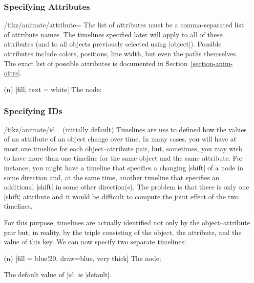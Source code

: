 \subsubsection{Specifying Attributes}
\label{section-anim-def-attr}

\begin{key}{/tikz/animate/attribute=}
    The list of attributes must be a comma-separated list of attribute names.
    The timelines specified later will apply to all of these attributes (and to
    all objects previously selected using |object|). Possible attributes
    include colors, positions, line width, but even the paths themselves. The
    exact list of possible attributes is documented in
    Section~\ref{section-anim-attrs}.
\begin{codeexample}[
    preamble={\usetikzlibrary{animations}},
    animation list={0.5,1,1.5,2},
]
\tikz [animate = {attribute = fill, n: = { 0s = "red", 2s = "blue",
                                           begin on = click } }]
  \node (n) [fill, text = white] {The node};
\end{codeexample}
\end{key}


\subsubsection{Specifying IDs}
\label{section-anim-def-id}

\begin{key}{/tikz/animate/id= (initially default)}
    Timelines are use to defined how the values of an attribute of an object
    change over time. In many cases, you will have at most one timeline for
    each object--attribute pair, but, sometimes, you may wish to have more than
    one timeline for the same object and the same attribute. For instance, you
    might have a timeline that specifies a changing |shift| of a node in some
    direction and, at the same time, another timeline that specifies an
    additional |shift| in some other direction(s). The problem is that there is
    only one |shift| attribute and it would be difficult to compute the joint
    effect of the two timelines.

    For this purpose, timelines are actually identified not only by the
    object--attribute pair but, in reality, by the triple consisting of the
    object, the attribute, and the value of this key. We can now specify two
    separate timelines:
\begin{codeexample}[
    preamble={\usetikzlibrary{animations}},
    animation list={0.5,1,1.5,2},
]
\tikz [animate = {
  id = 1, n:shift = { 0s = "{(0,0)}", 2s = "{(0,5mm)}", begin on = click },
  id = 2, n:shift = { 0s = "{(0,0)}", 2s = "{(5mm,0)}", begin on = click }
}]
  \node (n) [fill = blue!20, draw=blue, very thick] {The node};
\end{codeexample}

    The default value of |id| is |default|.
\end{key}

